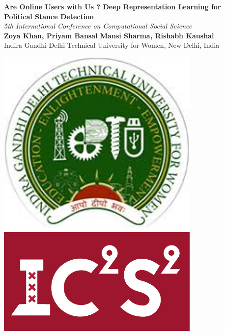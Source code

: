 \documentclass[a0,portrait]{a0poster}
\begin{document}


\begin{minipage}[b]{0.75\linewidth}
\veryHuge \color{NavyBlue} \textbf{Are Online Users with Us ? Deep Representation Learning for Political Stance Detection} \color{Black}\\ %
\Huge\textit{5th International Conference on Computational Social Science}\\[0.5cm]%
\huge \textbf{Zoya Khan, Priyam Bansal Mansi Sharma, Rishabh Kaushal}\\ %
\huge Indira Gandhi Delhi Technical University for Women, New Delhi, India\\ %

\end{minipage}
%
\begin{minipage}[b]{0.25\linewidth}
\includegraphics[width=10cm]{igdtuw_logo.jpg}\\
\includegraphics[width=10cm]{ic2s2.png}\\
\end{minipage}
\end{document}
